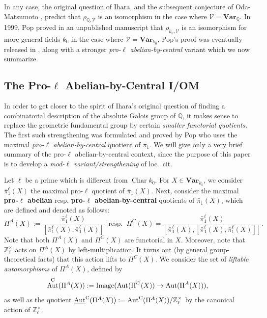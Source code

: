 \documentclass[11pt]{amsart}
\theoremstyle{definition}
\theoremstyle{remark}
\numberwithin{equation}{section}
\DeclareMathOperator{\Aut}{Aut}
\DeclareMathOperator{\Char}{Char}
\DeclareMathOperator{\image}{Image}
\newcommand{\Z}{\mathbb{Z}}
\newcommand{\Q}{\mathbb{Q}}
\newcommand{\Vc}{\mathcal{V}}
\newcommand{\UAut}{\underline{\Aut}}
\newcommand{\Var}{\mathbf{Var}}
\begin{document}
In any case, the original question of {\sc Ihara}, and the subsequent conjecture of {\sc Oda-Matsumoto} \cite{Matsumoto:1997}, predict that $\rho_{\Q,\Vc}$ is an isomorphism in the case where $\Vc = \Var_\Q$.
In 1999, {\sc Pop} proved in an unpublished manuscript that $\rho_{k_0,\Vc}$ is an isomorphism for more general fields $k_0$ in the case where $\Vc = \Var_{k_0}$.
{\sc Pop's} proof was eventually released in \cite{Pop:2014}, along with a stronger \emph{pro-$\ell$ abelian-by-central} variant which we now summarize.

\subsection{The Pro-$\ell$ Abelian-by-Central I/OM}
\label{subsection: intro / pro-ell-IOM}

In order to get closer to the spirit of {\sc Ihara's} original question of finding a combinatorial description of the absolute Galois group of $\Q$, it makes sense to replace the geometric fundamental group by certain \emph{smaller functorial quotients.}
The first such strengthening was formulated and proved by {\sc Pop} \cite{Pop:2014} who uses the maximal \emph{pro-$\ell$ abelian-by-central} quotient of $\bar\pi_1$.
We will give only a very brief summary of the pro-$\ell$ abelian-by-central context, since the purpose of this paper is to develop a \emph{mod-$\ell$ variant/strengthening} of loc.~cit.

Let $\ell$ be a prime which is different from $\Char k_0$.
For $X \in \Var_{k_0}$, we consider $\bar\pi_1^\ell(X)$ the maximal pro-$\ell$ quotient of $\bar\pi_1(X)$.
Next, consider the maximal {\bf pro-$\ell$ abelian} resp. {\bf pro-$\ell$ abelian-by-central} quotients of $\bar\pi_1(X)$, which are defined and denoted as follows:
\[ \Pi^A(X) := \frac{\bar\pi_1^\ell(X)}{[\bar\pi_1^\ell(X),\bar\pi_1^\ell(X)]} \ \text{ resp. } \ \Pi^C(X) = \frac{\bar\pi_1^\ell(X)}{[\bar\pi_1^\ell(X),[\bar\pi_1^\ell(X),\bar\pi_1^\ell(X)]]}. \]
Note that both $\Pi^A(X)$ and $\Pi^C(X)$ are functorial in $X$.
Moreover, note that $\Z_\ell^\times$ acts on $\Pi^A(X)$ by left-multiplication.
It turns out (by general group-theoretical facts) that this action lifts to $\Pi^C(X)$.
We consider the set of \emph{liftable automorphisms} of $\Pi^A(X)$, defined by
\[ \Aut^{\rm C}(\Pi^A(X)) := \image(\Aut(\Pi^C(X)) \rightarrow \Aut(\Pi^A(X))), \]
as well as the quotient $\UAut^{\rm C}(\Pi^A(X)) := \Aut^{\rm C}(\Pi^A(X))/\Z_\ell^\times$ by the canonical action of $\Z_\ell^\times$.
\end{document}
